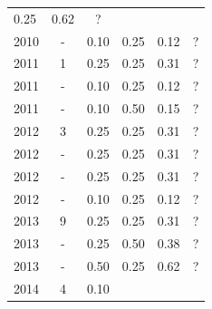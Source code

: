 \begin{table}[H]
\begin{tabular}{| l | c | c | c | c | c |}
          0.25
          &
            {\color{blue} 0.62}
          &
          ?
          \\
            2010
          &
          -
          &
          0.10
          &
          0.25
          &
            {\color{red} 0.12}
          &
          ?
          \\
\hline
            2011
          &
          1
          &
          0.25
          &
          0.25
          &
            {\color{red} 0.31}
          &
          ?
          \\
            2011
          &
          -
          &
          0.10
          &
          0.25
          &
            {\color{red} 0.12}
          &
          ?
          \\
            2011
          &
          -
          &
          0.10
          &
          0.50
          &
            {\color{red} 0.15}
          &
          ?
          \\
\hline
            2012
          &
          3
          &
          0.25
          &
          0.25
          &
            {\color{red} 0.31}
          &
          ?
          \\
            2012
          &
          -
          &
          0.25
          &
          0.25
          &
            {\color{red} 0.31}
          &
          ?
          \\
            2012
          &
          -
          &
          0.25
          &
          0.25
          &
            {\color{red} 0.31}
          &
          ?
          \\
            2012
          &
          -
          &
          0.10
          &
          0.25
          &
            {\color{red} 0.12}
          &
          ?
          \\
\hline
            2013
          &
          9
          &
          0.25
          &
          0.25
          &
            {\color{red} 0.31}
          &
          ?
          \\
            2013
          &
          -
          &
          0.25
          &
          0.50
          &
            {\color{red} 0.38}
          &
          ?
          \\
            2013
          &
          -
          &
          0.50
          &
          0.25
          &
            {\color{blue} 0.62}
          &
          ?
          \\
\hline
            2014
          &
          4
          &
          0.10
          &

\end{tabular}
\end{table}
